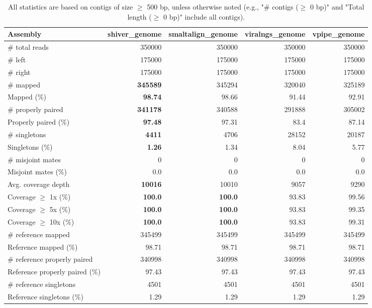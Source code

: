 \documentclass[12pt,a4paper]{article}
\begin{document}
\begin{table}[ht]
\begin{center}
\caption{All statistics are based on contigs of size $\geq$ 500 bp, unless otherwise noted (e.g., "\# contigs ($\geq$ 0 bp)" and "Total length ($\geq$ 0 bp)" include all contigs).}
\begin{tabular}{|l*{4}{|r}|}
\hline
Assembly & shiver\_genome & smaltalign\_genome & viralngs\_genome & vpipe\_genome \\ \hline
\# total reads & 350000 & 350000 & 350000 & 350000 \\ \hline
\# left & 175000 & 175000 & 175000 & 175000 \\ \hline
\# right & 175000 & 175000 & 175000 & 175000 \\ \hline
\# mapped & {\bf 345589} & 345294 & 320040 & 325189 \\ \hline
Mapped (\%) & {\bf 98.74} & 98.66 & 91.44 & 92.91 \\ \hline
\# properly paired & {\bf 341178} & 340588 & 291888 & 305002 \\ \hline
Properly paired (\%) & {\bf 97.48} & 97.31 & 83.4 & 87.14 \\ \hline
\# singletons & {\bf 4411} & 4706 & 28152 & 20187 \\ \hline
Singletons (\%) & {\bf 1.26} & 1.34 & 8.04 & 5.77 \\ \hline
\# misjoint mates & 0 & 0 & 0 & 0 \\ \hline
Misjoint mates (\%) & 0.0 & 0.0 & 0.0 & 0.0 \\ \hline
Avg. coverage depth & {\bf 10016} & 10010 & 9057 & 9290 \\ \hline
Coverage $\geq$ 1x (\%) & {\bf 100.0} & {\bf 100.0} & 93.83 & 99.56 \\ \hline
Coverage $\geq$ 5x (\%) & {\bf 100.0} & {\bf 100.0} & 93.83 & 99.35 \\ \hline
Coverage $\geq$ 10x (\%) & {\bf 100.0} & {\bf 100.0} & 93.83 & 99.31 \\ \hline
\# reference mapped & 345499 & 345499 & 345499 & 345499 \\ \hline
Reference mapped (\%) & 98.71 & 98.71 & 98.71 & 98.71 \\ \hline
\# reference properly paired & 340998 & 340998 & 340998 & 340998 \\ \hline
Reference properly paired (\%) & 97.43 & 97.43 & 97.43 & 97.43 \\ \hline
\# reference singletons & 4501 & 4501 & 4501 & 4501 \\ \hline
Reference singletons (\%) & 1.29 & 1.29 & 1.29 & 1.29 \\ \hline

\end{tabular}
\end{center}
\end{table}
\end{document}
